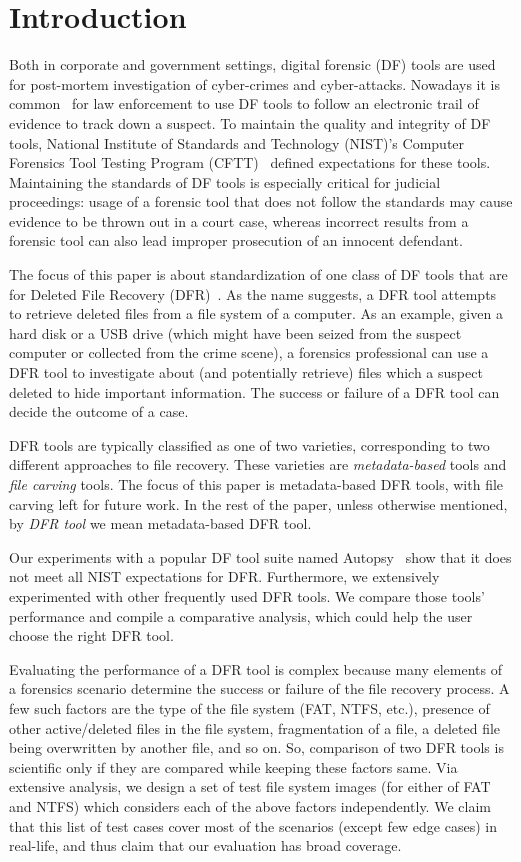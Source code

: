 
\section{Introduction}

Both in corporate and government settings, digital forensic (DF) tools are used for post-mortem investigation of cyber-crimes and cyber-attacks. 
Nowadays it is common~\cite{df:news} for law enforcement to use DF tools to follow an electronic trail of evidence to track down a suspect. 
To maintain the quality and integrity of DF tools, National Institute of Standards and Technology (NIST)'s 
Computer Forensics Tool Testing Program (CFTT)~\cite{cftt:nist} 
defined expectations for these tools. Maintaining the standards of DF tools 
is especially critical for judicial proceedings: usage of a forensic tool that does not follow the standards may cause evidence to be thrown 
out in a court case, whereas incorrect results from a forensic tool can also lead improper prosecution of an innocent defendant. 

The focus of this paper is about standardization of one class of DF 
tools that are for Deleted File Recovery (DFR)~\cite{meta:dfr:standards}. 
As the name suggests, a DFR tool attempts to retrieve deleted files
from a file system of a computer. As an example, given a hard disk or a USB drive 
(which might have been seized from the suspect computer or collected from the crime scene), a 
forensics professional can use a DFR tool to investigate about (and potentially retrieve) files which 
a suspect deleted to hide important information. 
The success or failure of a DFR tool can decide the outcome of a case.  

DFR tools are typically classified as one of two varieties, corresponding to two different approaches to file recovery.
These varieties are \emph{metadata-based} tools and \emph{file carving} tools.
The focus of this paper is metadata-based DFR tools, with file carving left for future work.
In the rest of the paper, unless otherwise mentioned, by \emph{DFR tool} we mean metadata-based DFR tool.

Our experiments with a popular DF tool suite named Autopsy~\cite{autopsy} 
show that it does not meet all NIST expectations for DFR. 
Furthermore, we extensively experimented with other frequently used DFR tools. 
We compare those tools' performance and compile a comparative analysis, which could help the user choose the right DFR tool. 

Evaluating the performance of a DFR tool is complex because many elements of a forensics scenario determine 
the success or failure of the file recovery process. 
A few such factors are the type of the file system (FAT, NTFS, etc.), presence of other active/deleted 
files in the file system, fragmentation of a file, a deleted file being overwritten by another file, and so on.
So, comparison of two DFR tools is scientific only if they are compared while keeping these factors same. 
Via extensive analysis, we design a set of test file system images (for either of FAT and NTFS) which considers each of the above factors independently. 
We claim that this list of test cases cover most of the scenarios (except few edge cases) in real-life, and thus claim that our evaluation has broad coverage. 

